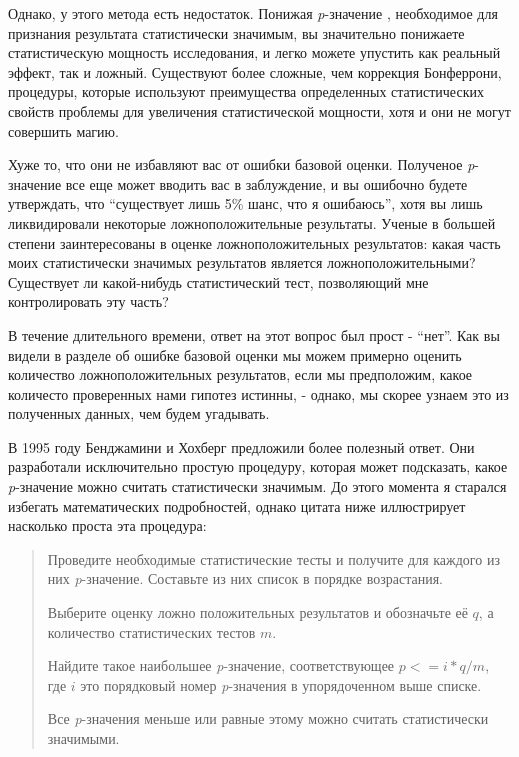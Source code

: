 Однако, у этого метода есть недостаток. Понижая \emph{p}-значение , необходимое для признания результата статистически значимым, вы значительно понижаете статистическую мощность исследования, и легко можете упустить как реальный эффект, так и ложный. Существуют более сложные, чем коррекция Бонферрони, процедуры, которые используют преимущества определенных статистических свойств проблемы для увеличения статистической мощности, хотя и они не могут совершить магию. 

Хуже то, что они не избавляют вас от ошибки базовой оценки. Полученое \emph{p}-значение все еще может вводить вас в заблуждение, и вы ошибочно будете утверждать, что ``существует лишь 5\% шанс, что я ошибаюсь'', хотя вы лишь ликвидировали некоторые ложноположительные результаты. Ученые в большей степени заинтересованы в оценке ложноположительных результатов: какая часть моих статистически значимых результатов является ложноположительными? Существует ли какой-нибудь статистический тест, позволяющий мне контролировать эту часть? 

В течение длительного времени, ответ на этот вопрос был прост - ``нет''. Как вы видели в разделе об ошибке базовой оценки мы можем примерно оценить количество ложноположительных результатов, если мы предположим, какое количесто проверенных нами гипотез истинны, - однако, мы скорее узнаем это из полученных данных, чем будем угадывать. 

В 1995 году Бенджамини и Хохберг предложили более полезный ответ. Они разработали исключительно простую процедуру, которая может подсказать, какое \emph{p}-значение можно считать статистически значимым. До этого момента я старался избегать математических подробностей, однако цитата ниже иллюстрирует насколько проста эта процедура:

\begin{quotation}
Проведите необходимые статистические тесты и получите для каждого из них \emph{p}-значение. Составьте из них список в порядке возрастания.

Выберите оценку ложно положительных результатов и обозначьте её $q$, а количество статистических тестов $m$.

Найдите такое наибольшее \emph{p}-значение, соответствующее $p <= i*q/m$, где $i$ это порядковый номер \emph{p}-значения в упорядоченном выше списке.

Все \emph{p}-значения меньше или равные этому можно считать статистически значимыми. 
\end{quotation}  

